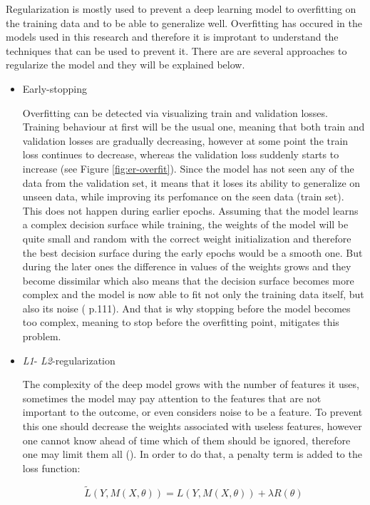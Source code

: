 Regularization is mostly used to prevent a deep learning model to overfitting on the training data and to be able to generalize well. Overfitting has occured in the models used in this research and therefore it is improtant to understand the techniques that can be used to prevent it. There are are several approaches to regularize the model and they will be explained below.

\begin{itemize}
	\item Early-stopping

	Overfitting can be detected via visualizing train and validation losses. Training behaviour at first will be the usual one, meaning that both train and validation losses are gradually decreasing, however at some point the train loss continues to decrease, whereas the validation loss suddenly starts to increase (see Figure \ref{fig:er-overfit}). Since the model has not seen any of the data from the validation set, it means that it loses its ability to generalize on unseen data, while improving its perfomance on the seen data (train set). This does not happen during earlier epochs. Assuming that the model learns a complex decision surface while training, the weights of the model will be quite small and random with the correct weight initialization and therefore the best decision surface during the early epochs would be a smooth one. But during the later ones the difference in values of the weights grows and they become dissimilar which also means that the decision surface becomes more complex and the model is now able to fit not only the training data itself, but also its noise (\cite{mitchell_1997} p.111). And that is why stopping before the model becomes too complex, meaning to stop before the overfitting point, mitigates this problem.

	\item \emph{L1}- \emph{L2}-regularization

	The complexity of the deep model grows with the number of features it uses, sometimes the model may pay attention to the features that are not important to the outcome, or even considers noise to be a feature. To prevent this one should decrease the weights associated with useless features, however one cannot know ahead of time which of them should be ignored, therefore one may limit them all (\cite{Ying_2019}). In order to do that, a penalty term is added to the loss function:

	\begin{equation}
	\tilde{L}(Y, M(X, \theta)) = L(Y, M(X, \theta)) + \lambda R(\theta)
	\end{equation}


\end{itemize}
